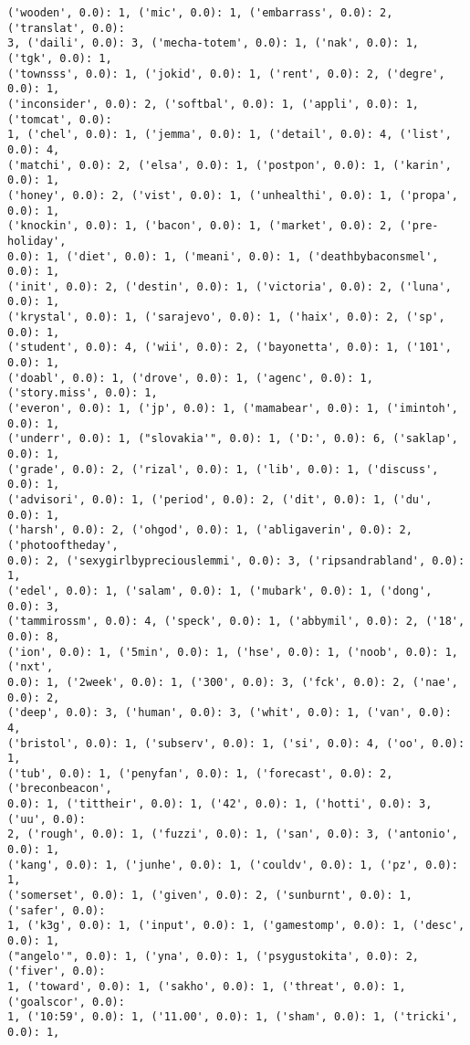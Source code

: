 \documentclass[11pt]{article}
\begin{document}
\begin{Verbatim}[commandchars=\\\{\}]
('wooden', 0.0): 1, ('mic', 0.0): 1, ('embarrass', 0.0): 2, ('translat', 0.0):
3, ('daili', 0.0): 3, ('mecha-totem', 0.0): 1, ('nak', 0.0): 1, ('tgk', 0.0): 1,
('townsss', 0.0): 1, ('jokid', 0.0): 1, ('rent', 0.0): 2, ('degre', 0.0): 1,
('inconsider', 0.0): 2, ('softbal', 0.0): 1, ('appli', 0.0): 1, ('tomcat', 0.0):
1, ('chel', 0.0): 1, ('jemma', 0.0): 1, ('detail', 0.0): 4, ('list', 0.0): 4,
('matchi', 0.0): 2, ('elsa', 0.0): 1, ('postpon', 0.0): 1, ('karin', 0.0): 1,
('honey', 0.0): 2, ('vist', 0.0): 1, ('unhealthi', 0.0): 1, ('propa', 0.0): 1,
('knockin', 0.0): 1, ('bacon', 0.0): 1, ('market', 0.0): 2, ('pre-holiday',
0.0): 1, ('diet', 0.0): 1, ('meani', 0.0): 1, ('deathbybaconsmel', 0.0): 1,
('init', 0.0): 2, ('destin', 0.0): 1, ('victoria', 0.0): 2, ('luna', 0.0): 1,
('krystal', 0.0): 1, ('sarajevo', 0.0): 1, ('haix', 0.0): 2, ('sp', 0.0): 1,
('student', 0.0): 4, ('wii', 0.0): 2, ('bayonetta', 0.0): 1, ('101', 0.0): 1,
('doabl', 0.0): 1, ('drove', 0.0): 1, ('agenc', 0.0): 1, ('story.miss', 0.0): 1,
('everon', 0.0): 1, ('jp', 0.0): 1, ('mamabear', 0.0): 1, ('imintoh', 0.0): 1,
('underr', 0.0): 1, ("slovakia'", 0.0): 1, ('D:', 0.0): 6, ('saklap', 0.0): 1,
('grade', 0.0): 2, ('rizal', 0.0): 1, ('lib', 0.0): 1, ('discuss', 0.0): 1,
('advisori', 0.0): 1, ('period', 0.0): 2, ('dit', 0.0): 1, ('du', 0.0): 1,
('harsh', 0.0): 2, ('ohgod', 0.0): 1, ('abligaverin', 0.0): 2, ('photooftheday',
0.0): 2, ('sexygirlbypreciouslemmi', 0.0): 3, ('ripsandrabland', 0.0): 1,
('edel', 0.0): 1, ('salam', 0.0): 1, ('mubark', 0.0): 1, ('dong', 0.0): 3,
('tammirossm', 0.0): 4, ('speck', 0.0): 1, ('abbymil', 0.0): 2, ('18', 0.0): 8,
('ion', 0.0): 1, ('5min', 0.0): 1, ('hse', 0.0): 1, ('noob', 0.0): 1, ('nxt',
0.0): 1, ('2week', 0.0): 1, ('300', 0.0): 3, ('fck', 0.0): 2, ('nae', 0.0): 2,
('deep', 0.0): 3, ('human', 0.0): 3, ('whit', 0.0): 1, ('van', 0.0): 4,
('bristol', 0.0): 1, ('subserv', 0.0): 1, ('si', 0.0): 4, ('oo', 0.0): 1,
('tub', 0.0): 1, ('penyfan', 0.0): 1, ('forecast', 0.0): 2, ('breconbeacon',
0.0): 1, ('tittheir', 0.0): 1, ('42', 0.0): 1, ('hotti', 0.0): 3, ('uu', 0.0):
2, ('rough', 0.0): 1, ('fuzzi', 0.0): 1, ('san', 0.0): 3, ('antonio', 0.0): 1,
('kang', 0.0): 1, ('junhe', 0.0): 1, ('couldv', 0.0): 1, ('pz', 0.0): 1,
('somerset', 0.0): 1, ('given', 0.0): 2, ('sunburnt', 0.0): 1, ('safer', 0.0):
1, ('k3g', 0.0): 1, ('input', 0.0): 1, ('gamestomp', 0.0): 1, ('desc', 0.0): 1,
("angelo'", 0.0): 1, ('yna', 0.0): 1, ('psygustokita', 0.0): 2, ('fiver', 0.0):
1, ('toward', 0.0): 1, ('sakho', 0.0): 1, ('threat', 0.0): 1, ('goalscor', 0.0):
1, ('10:59', 0.0): 1, ('11.00', 0.0): 1, ('sham', 0.0): 1, ('tricki', 0.0): 1,

\end{Verbatim}
\end{document}
